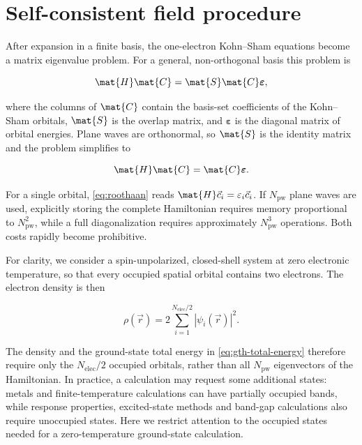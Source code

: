 %
%
%
\section{Self-consistent field procedure}

After expansion in a finite basis, the one-electron Kohn--Sham equations become a matrix eigenvalue problem. For a general, non-orthogonal basis this problem is

\begin{equation}
    \mat{H}\mat{C} = \mat{S}\mat{C}\boldsymbol{\varepsilon},
\end{equation}

where the columns of \(\mat{C}\) contain the basis-set coefficients of the Kohn--Sham orbitals, \(\mat{S}\) is the overlap matrix, and \(\boldsymbol{\varepsilon}\) is the diagonal matrix of orbital energies. Plane waves are orthonormal, so \(\mat{S}\) is the identity matrix and the problem simplifies to

\begin{equation}
    \mat{H}\mat{C} = \mat{C}\boldsymbol{\varepsilon}.
    \label{eq:roothaan}
\end{equation}

For a single orbital, \cref{eq:roothaan} reads \(\mat{H}\vec{c}_{i}=\varepsilon_i\vec{c}_{i}\). If \(N_{\text{pw}}\) plane waves are used, explicitly storing the complete Hamiltonian requires memory proportional to \(N_{\text{pw}}^{2}\), while a full diagonalization requires approximately \(N_{\text{pw}}^{3}\) operations. Both costs rapidly become prohibitive.

For clarity, we consider a spin-unpolarized, closed-shell system at zero electronic temperature, so that every occupied spatial orbital contains two electrons. The electron density is then

\begin{equation}
    \rho(\vec{r}) = 2\sum_{i=1}^{N_{\text{elec}}/2} |\psi_{i}(\vec{r})|^{2}.
    \label{eq:edens_analytical}
\end{equation}

The density and the ground-state total energy in \cref{eq:gth-total-energy} therefore require only the \(N_{\text{elec}}/2\) occupied orbitals, rather than all \(N_{\text{pw}}\) eigenvectors of the Hamiltonian. In practice, a calculation may request some additional states: metals and finite-temperature calculations can have partially occupied bands, while response properties, excited-state methods and band-gap calculations also require unoccupied states. Here we restrict attention to the occupied states needed for a zero-temperature ground-state calculation.

